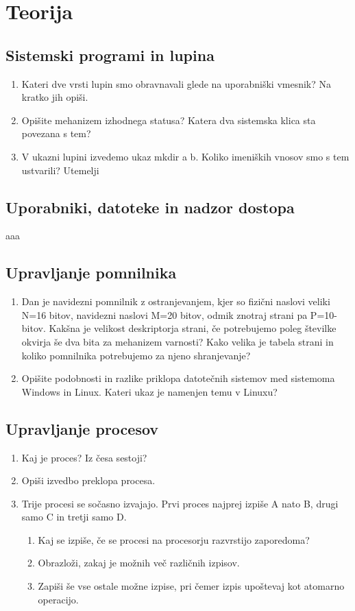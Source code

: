 \documentclass{book}
\begin{document}
\chapter{Teorija}
\section{Sistemski programi in lupina}

\begin{enumerate}
    \item Kateri dve vrsti lupin smo obravnavali glede na uporabniški vmesnik? Na kratko jih opiši.
    \item Opišite mehanizem izhodnega statusa? Katera dva sistemska klica sta povezana s tem?
    \item V ukazni lupini izvedemo ukaz mkdir a b. Koliko imeniških vnosov smo s tem ustvarili? Utemelji
    
\end{enumerate}

\section{Uporabniki, datoteke in nadzor dostopa}
aaa

\section{Upravljanje pomnilnika}
\begin{enumerate}
    \item Dan je navidezni pomnilnik z ostranjevanjem, kjer so fizični naslovi veliki N=16 bitov, navidezni naslovi M=20 bitov, odmik znotraj strani pa P=10-bitov. Kakšna je velikost deskriptorja strani, če potrebujemo poleg številke okvirja še dva bita za mehanizem varnosti? Kako velika je tabela strani in koliko pomnilnika potrebujemo za njeno shranjevanje?
    \item Opišite podobnosti in razlike priklopa datotečnih sistemov med sistemoma Windows in Linux. Kateri ukaz je namenjen temu v Linuxu?
\end{enumerate}

\section{Upravljanje procesov}
\begin{enumerate}
    \item Kaj je proces? Iz česa sestoji?
    \item Opiši izvedbo preklopa procesa.
    \item Trije procesi se sočasno izvajajo. Prvi proces najprej izpiše A nato B, drugi samo C in tretji samo D.
        \begin{enumerate}
            \item Kaj se izpiše, če se procesi na procesorju razvrstijo zaporedoma?
            \item Obrazloži, zakaj je možnih več različnih izpisov.
            \item Zapiši še vse ostale možne izpise, pri čemer izpis upoštevaj kot atomarno operacijo.
        \end{enumerate}
\end{enumerate}
\end{document}
